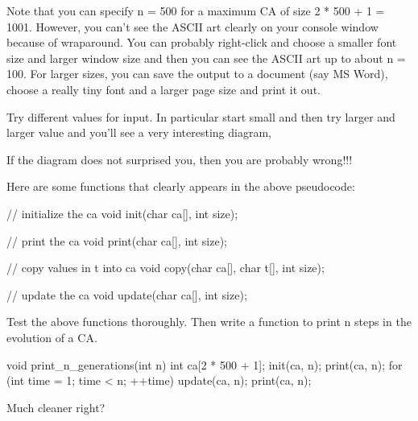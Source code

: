 Note that you can specify n = 500 for a maximum CA of size 2 * 500 + 1 = 1001. However, you can't see the ASCII art clearly on your console window because of wraparound. You can probably right-click and choose a smaller font size and larger window size and then you can see the ASCII art up to about n = 100. For larger sizes, you can save the output to a document (say MS Word), choose a really tiny font and a larger page size and print it out.

Try different values for input. In particular start small and then try larger and larger value and you'll see a very interesting diagram,

If the diagram does not surprised you, then you are probably wrong!!!

Here are some functions that clearly appears in the above pseudocode:

\begin{consolethree}[escapeinside=||]
// initialize the ca
void init(char ca[], int size);

// print the ca
void print(char ca[], int size);

// copy values in t into ca
void copy(char ca[], char t[], int size);

// update the ca
void update(char ca[], int size);
\end{consolethree}

Test the above functions thoroughly. Then write a function to print n steps in the evolution of a CA.

\begin{consolethree}[escapeinside=||]
void print_n_generations(int n)
{
    int ca[2 * 500 + 1];
    init(ca, n);
    print(ca, n);
    for (int time = 1; time < n; ++time)
    {
        update(ca, n);
        print(ca, n);
    }
}
\end{consolethree}

Much cleaner right?




